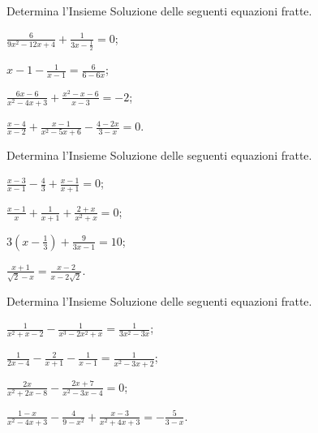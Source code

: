 \begin{esercizio}[\Ast]
\label{ese:3.39}
Determina l'Insieme Soluzione delle seguenti equazioni fratte.
\begin{multicols}{2}
\begin{enumeratea}
\item $\frac{6}{9 x^{2}-12 x + 4} + \frac{1}{3 x-\frac{1}{2}} =0$;
\item $x-1-\frac{1}{x-1} = \frac{6}{6-6 x}$;
\item $\frac{6 x-6}{x^{2}-4 x + 3} + \frac{x^{2}-x-6}{x-3}=-2$;
\item $\frac{x-4}{x-2} + \frac{x-1}{x^{2}-5 x + 6}-\frac{4 -2 x}{3-x} = 0$.
\end{enumeratea}
\end{multicols}
\end{esercizio}
\pagebreak
\begin{esercizio}[\Ast]
 \label{ese:3.40}
Determina l'Insieme Soluzione delle seguenti equazioni fratte.
\begin{multicols}{2}
\begin{enumeratea}
\item $\frac{x-3}{x-1}-\frac{4}{3} + \frac{x-1}{x + 1}=0$;
\item $\frac{x-1}{x} + \frac{1}{x + 1} + \frac{2 + x}{x^{2} + x} =0$;
\item $3 \left(x-\frac{1}{3} \right) + \frac{9}{3x-1} = 10$;
\item $\frac{x + 1}{\sqrt{2}-x} = \frac{x-2}{x-2 \sqrt{2}}$.
\end{enumeratea}
\end{multicols}
\end{esercizio}

\begin{esercizio}[\Ast]
 \label{ese:3.41}
Determina l'Insieme Soluzione delle seguenti equazioni fratte.
\begin{multicols}{2}
\begin{enumeratea}
\item $\frac{1}{x^{2} + x-2}-\frac{1}{x^{3}-2 x^{2} + x}=\frac{1}{3 x^{2}-3 x}$;
\item $\frac{1}{2 x-4}-\frac{2}{x + 1}-\frac{1}{x-1}=\frac{1}{x^{2}-3 x + 2}$;
\item $\frac{2 x}{x^{2} + 2 x-8}-\frac{2 x + 7}{x^{2}-3 x-4}= 0$;
\item $\frac{1-x}{x^{2}-4 x + 3}-\frac{4}{9-x^{2}} + \frac{x- 3}{x^{2} + 4 x + 3} =-\frac{5}{3-x}$.
\end{enumeratea}
\end{multicols}
\end{esercizio}

